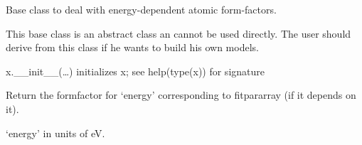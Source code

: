 \documentclass[letterpaper,10pt,english]{sphinxmanual}
\begin{document}

\begin{fulllineitems}
\label{\detokenize{modules-api/samplerepresentation:SampleRepresentation.Formfactor}}
Base class to deal with energy-dependent atomic form-factors.

This base class is an abstract class an cannot be used directly.
The user should derive from this class if he wants to build his own models.

\begin{fulllineitems}
\label{\detokenize{modules-api/samplerepresentation:SampleRepresentation.Formfactor.__init__}}
x.\_\_init\_\_(…) initializes x; see help(type(x)) for signature

\end{fulllineitems}


\begin{fulllineitems}
\label{\detokenize{modules-api/samplerepresentation:SampleRepresentation.Formfactor.getFF}}
Return the formfactor for ‘energy’ corresponding to fitpararray (if it depends on it).

‘energy’ in units of eV.

\end{fulllineitems}


\end{fulllineitems}

\end{document}
